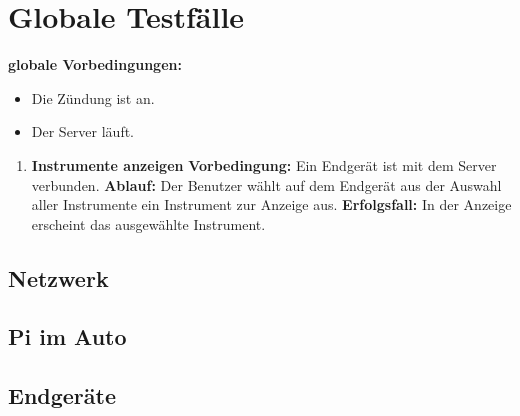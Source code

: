 \documentclass[pflichtenheft.tex]{subfiles}
\begin{document}
\chapter{Globale Testfälle}
\textbf{globale Vorbedingungen:}
\begin{itemize}
\item
Die Zündung ist an.
\item
Der Server läuft.
\end{itemize}

\begin{enumerate}

\item{\textbf{Instrumente anzeigen}}
\textbf{Vorbedingung: } Ein Endgerät ist mit dem Server verbunden.
\textbf{Ablauf: } Der Benutzer wählt auf dem Endgerät aus der Auswahl aller Instrumente ein Instrument zur Anzeige aus.
\textbf{Erfolgsfall: } In der Anzeige erscheint das ausgewählte Instrument.

\end{enumerate}

\section{Netzwerk}
\section{Pi im Auto}
\section{Endgeräte}
\end{document}
